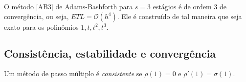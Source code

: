 %
%
%
%
%

\begin{ex}
O método \eqref{AB3} de Adams-Bashforth para $s=3$ estágios é de ordem $3$ de convergência, ou seja, $ETL = \mathcal O(h^4)$. Ele é construído de tal maneira que seja exato para os polinômios $1,t,t^2,t^3$.
\end{ex}


\subsection{Consistência, estabilidade e convergência}
\begin{teo}
Um método de passo múltiplo é \emph{consistente} se $\rho (1)=0$ e $\rho '(1)=\sigma (1)$.
\end{teo}


